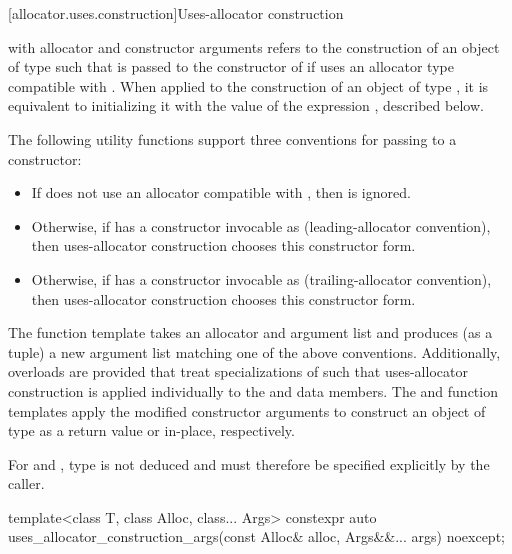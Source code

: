 [allocator.uses.construction]{Uses-allocator construction}

\pnum
{}
with allocator  and constructor arguments 
refers to the construction of an object of type 
such that  is passed to the constructor of 
if  uses an allocator type compatible with .
When applied to the construction of an object of type ,
it is equivalent to initializing it with the value of the expression
, described below.

\pnum
The following utility functions support
three conventions for passing  to a constructor:
\begin{itemize}
\item
  If  does not use an allocator compatible with ,
  then  is ignored.
\item
  Otherwise, if  has a constructor invocable as
   (leading-allocator convention),
  then uses-allocator construction chooses this constructor form.
\item
  Otherwise, if  has a constructor invocable as
   (trailing-allocator convention),
  then uses-allocator construction chooses this constructor form.
\end{itemize}

\pnum
The  function template
takes an allocator and argument list and
produces (as a tuple) a new argument list matching one of the above conventions.
Additionally, overloads are provided
that treat specializations of 
such that uses-allocator construction is applied individually
to the  and  data members.
The  and
 function templates
apply the modified constructor arguments
to construct an object of type 
as a return value or in-place, respectively.
\begin{note}
For  and
, type 
is not deduced and must therefore be specified explicitly by the caller.
\end{note}

%
\begin{itemdecl}
template<class T, class Alloc, class... Args>
  constexpr auto uses_allocator_construction_args(const Alloc& alloc,
                                                  Args&&... args) noexcept;
\end{itemdecl}

